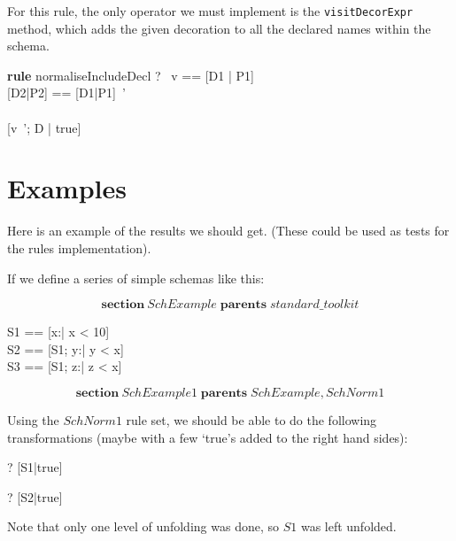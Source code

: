 \documentclass{article}
\newenvironment{zsection}{\[}{\]}
\newcommand{\SECTION}{\textbf{section}~}
\newcommand{\parents}{\mathrel{\textbf{parents}}}
\newenvironment{zedrule}[1]{\par\textbf{rule }#1\vspace{-1ex}\infrule}{\endinfrule}
\newcommand{\derives}{\derive{}}
\newcommand{\proviso}{\raisebox{0.5ex}{${}_{\blacktriangleright}\ $}}%
\begin{document}
For this rule, the only operator we must implement is the
\verb!visitDecorExpr! method, which adds the given decoration to all the
declared names within the schema.

\begin{zedrule}{normaliseIncludeDecl}
   \proviso ?~ v == [D1 | P1] \\
   \proviso [D2|P2] == [D1|P1]~' \\
   [D | true] \unfoldsTo [D3 | P3] \\
\derives
   [v~'; D | true] \unfoldsTo [D2;D3 | P2 \land P3]
\end{zedrule}



\section*{Examples}
Here is an example of the results we should get.
(These could be used as tests for the rules implementation).

If we define a series of simple schemas like this:

\begin{zsection}
  \SECTION SchExample \parents standard\_toolkit 
\end{zsection}

\begin{zed}
  S1 == [x:\nat | x < 10] \\
  S2 == [S1; y:\nat | y < x] \\
  S3 == [S1; z:\nat | z < x]
\end{zed}


\begin{zsection}
  \SECTION SchExample1 \parents SchExample, SchNorm1
\end{zsection}

Using the $SchNorm1$ rule set, we should be able to
do the following transformations (maybe with a few
`true's added to the right hand sides):

\begin{zed}
\vdash? [S1|true] \unfoldsTo [x:\nat | x<10]
\end{zed}
\begin{zed}
\vdash? [S2|true] \unfoldsTo [S1; y:\nat | y<x]
\end{zed}

Note that only one level of unfolding was done, so $S1$ was left unfolded.
\end{document}
